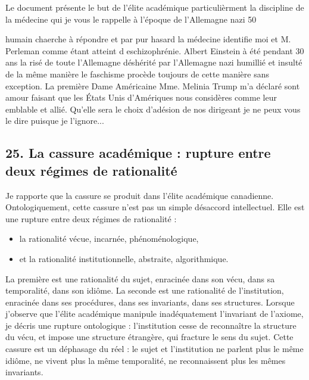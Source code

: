 \documentclass[12pt,a4paper]{article}
\begin{document}
Le document présente le but de l'élite académique particulièrment la discipline de la médecine qui je vous le rappelle à l'époque de l'Allemagne nazi 50%

humain chaerche à répondre et par pur hasard la médecine identifie moi et M. Perleman comme étant atteint d eschizophrénie. Albert Einstein à été pendant 30 ans la risé de toute l'Allemagne déshérité par l'Allemagne nazi humillié et insulté de la même manière le faschisme procède toujours de cette manière sans exception. La première Dame Américaine Mme. Melinia Trump m'a déclaré sont amour faisant que les États Unis d'Amériques nous considères comme leur emblable et allié. Qu'elle sera le choix d'adésion de nos dirigeant je ne peux vous le dire puisque je l'ignore...
\subsection*{25. La cassure académique : rupture entre deux régimes de rationalité}
Je rapporte que la cassure se produit dans l’élite académique canadienne. Ontologiquement, cette cassure n’est pas un simple désaccord intellectuel. Elle est une rupture entre deux régimes de rationalité :
\begin{itemize}
\item la rationalité vécue, incarnée, phénoménologique,
\item et la rationalité institutionnelle, abstraite, algorithmique.
\end{itemize}
La première est une rationalité du sujet, enracinée dans son vécu, dans sa temporalité, dans son idiôme. La seconde est une rationalité de l’institution, enracinée dans ses procédures, dans ses invariants, dans ses structures.
Lorsque j’observe que l’élite académique manipule inadéquatement l’invariant de l’axiome, je décris une rupture ontologique : l’institution cesse de reconnaître la structure du vécu, et impose une structure étrangère, qui fracture le sens du sujet.
Cette cassure est un déphasage du réel : le sujet et l’institution ne parlent plus le même idiôme, ne vivent plus la même temporalité, ne reconnaissent plus les mêmes invariants.
\end{document}
